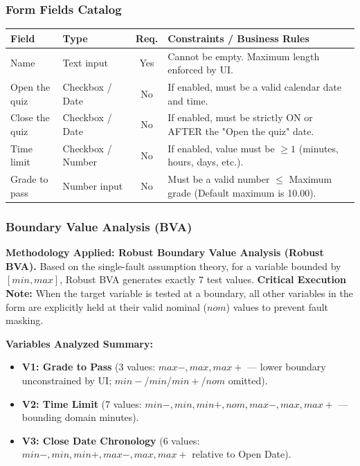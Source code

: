 \documentclass[twoside,final]{hcmut-report}
\begin{document}
\subsubsection{Form Fields Catalog}
\begin{table}[H]
\centering
\renewcommand{\arraystretch}{1.3}
\begin{tabularx}{\textwidth}{|l|l|c|X|}
\hline
\textbf{Field} & \textbf{Type} & \textbf{Req.} & \textbf{Constraints / Business Rules} \\ \hline
Name & Text input & Yes & Cannot be empty. Maximum length enforced by UI. \\ \hline
Open the quiz & Checkbox / Date & No & If enabled, must be a valid calendar date and time. \\ \hline
Close the quiz & Checkbox / Date & No & If enabled, must be strictly ON or AFTER the "Open the quiz" date. \\ \hline
Time limit & Checkbox / Number & No & If enabled, value must be $\ge 1$ (minutes, hours, days, etc.). \\ \hline
Grade to pass & Number input & No & Must be a valid number $\le$ Maximum grade (Default maximum is 10.00). \\ \hline
\end{tabularx}
\end{table}

\subsubsection{Boundary Value Analysis (BVA)}
\textbf{Methodology Applied: Robust Boundary Value Analysis (Robust BVA).} 
Based on the single-fault assumption theory, for a variable bounded by $[min, max]$, Robust BVA generates exactly 7 test values. \textbf{Critical Execution Note:} When the target variable is tested at a boundary, all other variables in the form are explicitly held at their valid nominal ($nom$) values to prevent fault masking.

\textbf{Variables Analyzed Summary:}
\begin{itemize}
    \item \textbf{V1: Grade to Pass} (3 values: $max-, max, max+$ --- lower boundary unconstrained by UI; $min-$/$min$/$min+$/$nom$ omitted).
    \item \textbf{V2: Time Limit} (7 values: $min-, min, min+, nom, max-, max, max+$ --- bounding domain minutes).
    \item \textbf{V3: Close Date Chronology} (6 values: $min-, min, min+, max-, max, max+$ relative to Open Date).
\end{itemize}
\end{document}
